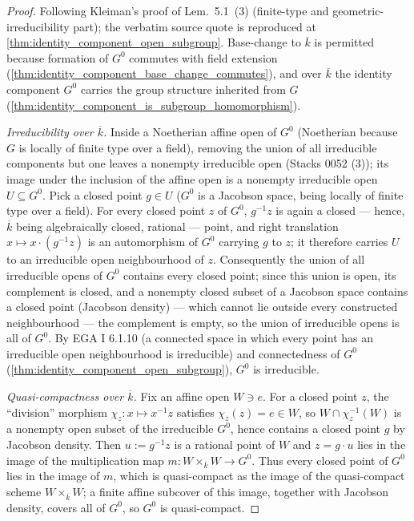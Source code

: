 \begin{proof}\leanok
  Following Kleiman's proof of Lem.~5.1~(3) (finite-type and
  geometric-irreducibility part); the verbatim source quote is
  reproduced at \cref{thm:identity_component_open_subgroup}. Base-change to
  \(\overline k\) is permitted because formation of \(G^0\) commutes with
  field extension (\cref{thm:identity_component_base_change_commutes}), and
  over \(\overline k\) the identity component \(G^0\) carries the group
  structure inherited from \(G\)
  (\cref{thm:identity_component_is_subgroup_homomorphism}).

  \emph{Irreducibility over \(\overline k\).}  Inside a Noetherian affine
  open of \(G^0\) (Noetherian because \(G\) is locally of finite type over a
  field), removing the union of all irreducible components but one leaves a
  nonempty irreducible open (Stacks 0052 (3)); its image under the
  inclusion of the affine open is a nonempty irreducible open
  \(U \subseteq G^0\). Pick a closed point \(g \in U\) (\(G^0\) is a
  Jacobson space, being locally of finite type over a field). For every
  closed point \(z\) of \(G^0\), \(g^{-1}z\) is again a closed --- hence,
  \(\overline k\) being algebraically closed, rational --- point, and right
  translation \(x \mapsto x \cdot (g^{-1}z)\) is an automorphism of \(G^0\)
  carrying \(g\) to \(z\); it therefore carries \(U\) to an irreducible open
  neighbourhood of \(z\). Consequently the union of all irreducible opens of
  \(G^0\) contains every closed point; since this union is open, its
  complement is closed, and a nonempty closed subset of a Jacobson space
  contains a closed point (Jacobson density) --- which cannot lie outside
  every constructed neighbourhood --- the complement is empty, so the union
  of irreducible opens is all of \(G^0\). By EGA I 6.1.10 (a connected space
  in which every point has an irreducible open neighbourhood is
  irreducible) and connectedness of \(G^0\)
  (\cref{thm:identity_component_open_subgroup}), \(G^0\) is irreducible.

  \emph{Quasi-compactness over \(\overline k\).}  Fix an affine open
  \(W \ni e\). For a closed point \(z\), the ``division'' morphism
  \(\chi_z : x \mapsto x^{-1}z\) satisfies \(\chi_z(z) = e \in W\), so
  \(W \cap \chi_z^{-1}(W)\) is a nonempty open subset of the irreducible
  \(G^0\), hence contains a closed point \(g\) by Jacobson density. Then
  \(u := g^{-1}z\) is a rational point of \(W\) and \(z = g \cdot u\) lies in
  the image of the multiplication map \(m : W \times_{\overline k} W \to
  G^0\). Thus every closed point of \(G^0\) lies in the image of \(m\),
  which is quasi-compact as the image of the quasi-compact scheme
  \(W \times_{\overline k} W\); a finite affine subcover of this image,
  together with Jacobson density, covers all of \(G^0\), so \(G^0\) is
  quasi-compact.


\end{proof}

